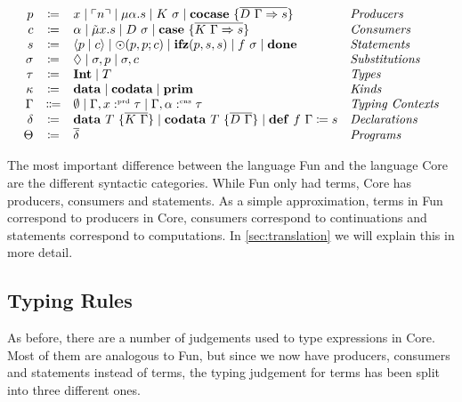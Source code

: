 \begin{definition}
  \[
    \begin{array}{rcll}
      p & \coloneqq & x \mid \lit{n} \mid \mu\alpha.s \mid K\ \sigma \mid \cocase{\overline{D\ \Gamma \Rightarrow s}} & \emph{Producers}\\
      c & \coloneqq & \alpha \mid \tilde{\mu}x.s \mid D\ \sigma \mid \case{\overline{K\ \Gamma \Rightarrow s}}& \emph{Consumers}\\
      s & \coloneqq & \cut{p}{c} \mid \odot(p, p; c) \mid \ifz{p}{s}{s} \mid f\ \sigma\mid \done & \emph{Statements}\\
      \sigma & \coloneqq & \nil \mid \sigma, p \mid \sigma, c & \emph{Substitutions}\\
      \tau & \coloneqq & \tyint \mid T & \emph{Types}\\
      \kappa & \coloneqq & \mathbf{data}\mid\mathbf{codata}\mid\mathbf{prim} & \emph{Kinds}\\
      \Gamma & \Coloneqq & \emptyset \mid \Gamma, x \prd \tau \mid \Gamma, \alpha \cnt \tau & \emph{Typing Contexts} \\
      \delta & \coloneqq & \mathbf{data}\ T\ \{ \overline{K\ \Gamma} \} \mid \mathbf{codata}\ T\ \{ \overline{D\ \Gamma }\} \mid \defi{f\ \Gamma}{s} & \emph{Declarations}\\
      \Theta & \coloneqq & \overline{\delta} & \emph{Programs}\\
    \end{array}
  \]
\end{definition}
The most important difference between the language Fun and the language Core are the different syntactic categories.
While Fun only had terms, Core has producers, consumers and statements. 
As a simple approximation, terms in Fun correspond to producers in Core, consumers correspond to continuations and statements correspond to computations. 
In \cref{sec:translation} we will explain this in more detail.

\subsection{Typing Rules}
\label{subsec:core:typing-rules}

As before, there are a number of judgements used to type expressions in Core. 
Most of them are analogous to Fun, but since we now have producers, consumers and statements instead of terms, the typing judgement for terms has been split into three different ones. 

